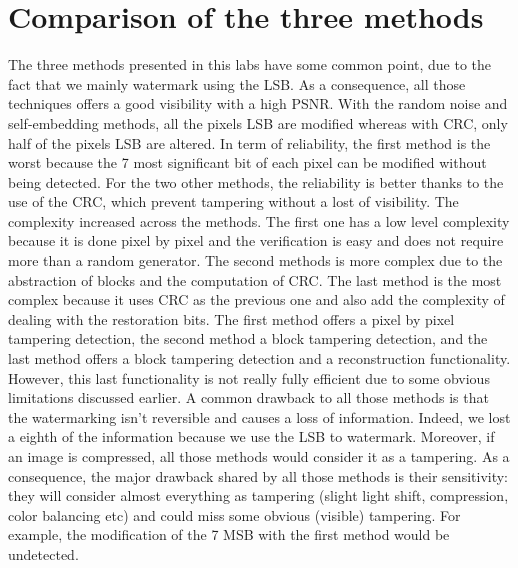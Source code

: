 \documentclass[11pt, oneside]{article}   	%
\begin{document}
\section{Comparison of the three methods}
The three methods presented in this labs have some common point, due to the fact that we mainly watermark using the LSB. \newline As a consequence, all those techniques offers a good visibility with a high PSNR. With the random noise and self-embedding methods, all the pixels LSB are modified whereas with CRC, only half of the pixels LSB are altered. \newline
In term of reliability, the first method is the worst because the 7 most significant bit of each pixel can be modified without being detected. For the two other methods, the reliability is better thanks to the use of the CRC, which prevent tampering without a lost of visibility. \newline
The complexity increased across the methods. The first one has a low level complexity because it is done pixel by pixel and the verification is easy and does not require more than a random generator. The second methods is more complex due to the abstraction of blocks and the computation of CRC. The last method is the most complex because it uses CRC as the previous one and also add the complexity of dealing with the restoration bits. \newline
The first method offers a pixel by pixel tampering detection, the second method a block tampering detection, and the last method offers a block tampering detection and a reconstruction functionality. However, this last functionality is not really fully efficient due to some obvious limitations discussed earlier.
\newline
\newline
A common drawback to all those methods is that the watermarking isn't reversible and causes a loss of information. Indeed, we lost a eighth of the information because we use the LSB to watermark. Moreover, if an image is compressed, all those methods would consider it as a tampering. As a consequence, the major drawback shared by all those methods is their sensitivity: they will consider almost everything as tampering (slight light shift, compression, color balancing etc) and could miss some obvious (visible) tampering. For example, the modification of the 7 MSB with the first method would be undetected. 
\end{document}
